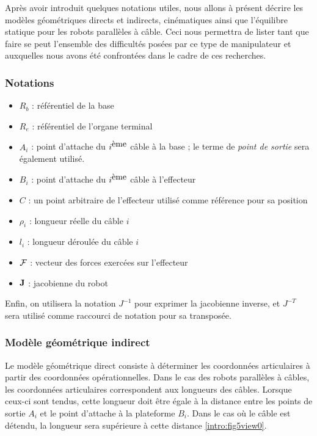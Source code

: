 Après avoir introduit quelques notations utiles, nous allons à présent décrire les modèles géométriques directs et indirects, cinématiques ainsi que l'équilibre statique pour les robots parallèles à câble. Ceci nous permettra de lister tant que faire se peut l'ensemble des difficultés posées par ce type de manipulateur et auxquelles nous avons été confrontées dans le cadre de ces recherches.

\subsubsection{Notations}

\begin{itemize}
 \item $R_b$ : référentiel de la base
 \item $R_e$ : référentiel de l'organe terminal
 \item $A_i$ : point d'attache du $i^{\hbox{ème}}$ câble à la base ; le terme de {\it point de sortie} sera également utilisé.
 \item $B_i$ : point d'attache du $i^{\hbox{ème}}$ câble à l'effecteur
 \item $C$ : un point arbitraire de l'effecteur utilisé comme référence pour sa position
 \item $\rho_i$ : longueur réelle du câble $i$
 \item $l_i$ : longueur déroulée du câble $i$
 \item $\bf {\mathcal F}$ : vecteur des forces exercées sur l'effecteur
 \item $\bf J$ : jacobienne du robot
\end{itemize}
Enfin, on utilisera la notation $J^{-1}$ pour exprimer la jacobienne inverse, et $J^{-T}$ sera utilisé comme raccourci de notation pour sa transposée.

\subsubsection{Modèle géométrique indirect}

Le modèle géométrique direct consiste à déterminer les coordonnées articulaires à partir des coordonnées opérationnelles. Dans le cas des robots parallèles à câbles, les coordonnées articulaires correspondent aux longueurs des câbles. Lorsque ceux-ci sont tendus, cette longueur doit être égale à la distance entre les points de sortie $A_i$ et le point d'attache à la plateforme $B_i$. Dans le cas où le câble est détendu, la longueur sera supérieure à cette distance \ref{intro:fig5view0}.\\


